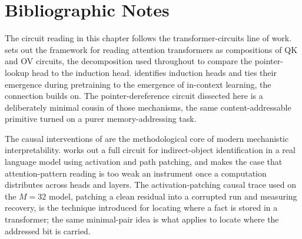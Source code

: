 
\section*{Bibliographic Notes}

The circuit reading in this chapter follows the transformer-circuits line of
work. \textcite{elhage2021framework} sets out the framework for reading
attention transformers as compositions of QK and OV circuits, the decomposition
used throughout  to compare the pointer-lookup head to
the induction head. \textcite{olsson2022induction} identifies induction heads and
ties their emergence during pretraining to the emergence of in-context learning,
the connection  builds on. The pointer-dereference circuit dissected
here is a deliberately minimal cousin of those mechanisms, the same
content-addressable primitive turned on a purer memory-addressing task.

The causal interventions of  are the methodological
core of modern mechanistic interpretability. \textcite{wang2022wild} works out a
full circuit for indirect-object identification in a real language model using
activation and path patching, and makes the case that attention-pattern reading
is too weak an instrument once a computation distributes across heads and layers.
The activation-patching causal trace used on the $M = 32$ model, patching a clean
residual into a corrupted run and measuring recovery, is the technique
\textcite{meng2022rome} introduced for locating where a fact is stored in a
transformer; the same minimal-pair idea is what  applies to
locate where the addressed bit is carried.
